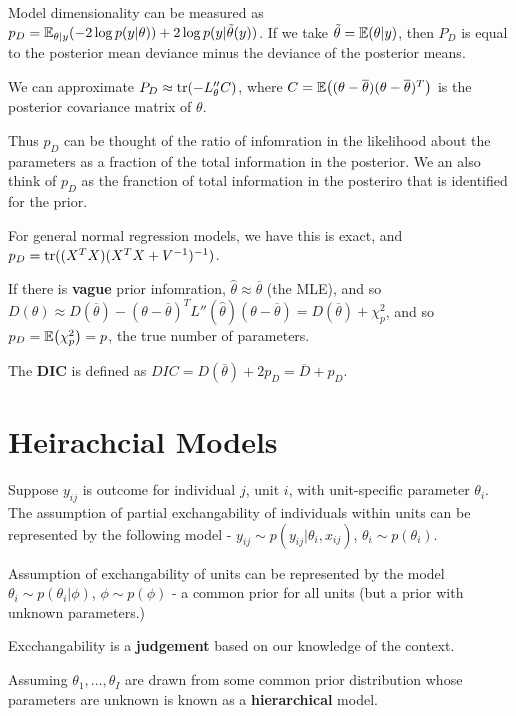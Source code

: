 \begin{defn}
  \label{sec:criticism-comparison-5}
  Model dimensionality can be measured as $p_{D} = \E_{\theta | y}(-2
  \log p(y | \theta)) + 2 \log p(y | \tilde \theta(y))$.  If we take
  $\tilde \theta = \E{\theta | y}$, then $P_{D}$ is equal to the
  posterior mean deviance minus the deviance of the posterior means.

  We can approximate $P_{D} \approx \operatorname*{tr}(-L_{\theta}'' C)$, where $C =
  \E{(\theta - \overline \theta)(\theta - \overline \theta)^{T}}$ is
  the posterior covariance matrix of $\theta$.

  Thus $p_{D}$ can be thought of the ratio of infomration in the
  likelihood about the parameters as a fraction of the total
  information in the posterior.  We an also think of $p_{D}$ as the
  franction of total information in the posteriro that is identified
  for the prior.

  For general normal regression models, we have this is exact, and
  $p_{D} = \operatorname*{tr}((X^{T} X)(X^{T}X + V^{-1})^{-1})$.

  If there is \textbf{vague} prior infomration, $\hat \theta \approx
  \overline \theta$ (the MLE), and so $D(\theta) \approx D(\overline
  \theta) - (\theta - \overline \theta)^{T} L''(\hat \theta)(\theta -
  \overline \theta) = D(\overline \theta) + \chi_{p}^{2}$, and so
  $p_{D} = \E{\chi^{2}_{p}} = p$, the true number of parameters.
\end{defn}


\begin{defn}
  \label{sec:criticism-comparison-6}
  The \textbf{DIC} is defined as $DIC = D(\overline \theta)+ 2 p_{D} =
  \overline D + p_{D}$.
\end{defn}

\section{Heirachcial Models}
\label{sec:heirachcial-models}

\begin{defn}
  \label{sec:heirachcial-models-1}
  Suppose $y_{ij}$ is outcome for individual $j$, unit $i$, with
  unit-specific parameter $\theta_{i}$.  The assumption of partial
  exchangability of individuals within units can be represented by the
  following model - $y_{ij} \sim p(y_{ij} | \theta_{i}, x_{ij})$,
  $\theta_{i} \sim p(\theta_{i})$.

  Assumption of exchangability of units can be represented by the
  model $\theta_{i} \sim p(\theta_{i} | \phi)$, $\phi \sim p(\phi)$ -
  a common prior for all units (but a prior with unknown parameters.)

  Excchangability is a \textbf{judgement} based on our knowledge of
  the context.

  Assuming $\theta_{1}, \dots, \theta_{I}$ are drawn from some common
  prior distribution whose parameters are unknown is known as a
  \textbf{hierarchical} model.
\end{defn}


